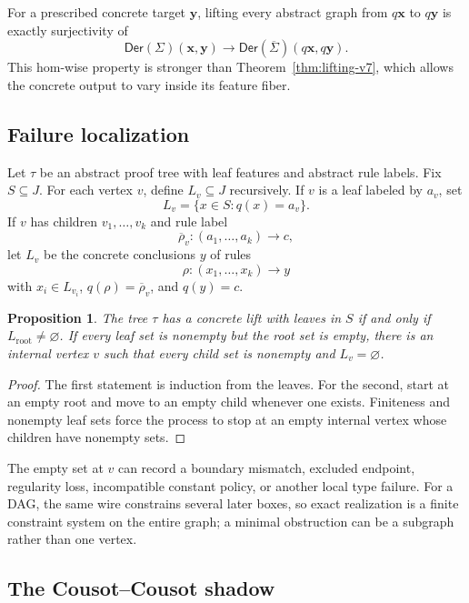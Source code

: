 \documentclass[10pt,journal,a4paper]{IEEEtran}
\newtheorem{proposition}[theorem]{Proposition}
\theoremstyle{definition}
\begin{document}
For a prescribed concrete target $\mathbf y$, lifting every abstract graph from $q\mathbf x$ to $q\mathbf y$ is exactly surjectivity of
\[
  \mathsf{Der}(\Sigma)(\mathbf x,\mathbf y)
  \longrightarrow
  \mathsf{Der}(\overline\Sigma)(q\mathbf x,q\mathbf y).
\]
This hom-wise property is stronger than Theorem~\ref{thm:lifting-v7}, which allows the concrete output to vary inside its feature fiber.

\subsection{Failure localization}

Let $\tau$ be an abstract proof tree with leaf features and abstract rule labels. Fix $S\subseteq J$. For each vertex $v$, define $L_v\subseteq J$ recursively. If $v$ is a leaf labeled by $a_v$, set
\[
  L_v=\{x\in S:q(x)=a_v\}.
\]
If $v$ has children $v_1,\ldots,v_k$ and rule label
\[
  \overline\rho_v:(a_1,\ldots,a_k)\longrightarrow c,
\]
let $L_v$ be the concrete conclusions $y$ of rules
\[
  \rho:(x_1,\ldots,x_k)\longrightarrow y
\]
with $x_i\in L_{v_i}$, $q(\rho)=\overline\rho_v$, and $q(y)=c$.

\begin{proposition}
The tree $\tau$ has a concrete lift with leaves in $S$ if and only if $L_{\mathrm{root}}\neq\varnothing$. If every leaf set is nonempty but the root set is empty, there is an internal vertex $v$ such that every child set is nonempty and $L_v=\varnothing$.
\end{proposition}

\begin{proof}
The first statement is induction from the leaves. For the second, start at an empty root and move to an empty child whenever one exists. Finiteness and nonempty leaf sets force the process to stop at an empty internal vertex whose children have nonempty sets.
\end{proof}

The empty set at $v$ can record a boundary mismatch, excluded endpoint, regularity loss, incompatible constant policy, or another local type failure. For a DAG, the same wire constrains several later boxes, so exact realization is a finite constraint system on the entire graph; a minimal obstruction can be a subgraph rather than one vertex.

\subsection{The Cousot--Cousot shadow}
\end{document}
